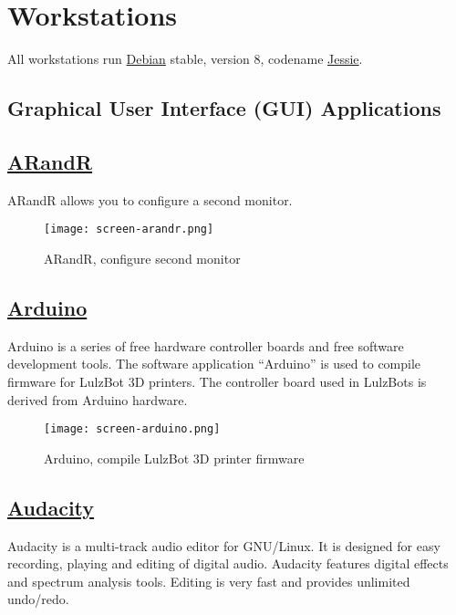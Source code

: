 \section{Workstations}
All workstations run \href{http://www.debian.org/}{Debian} stable, version 8,
codename \href{https://www.debian.org/releases/jessie/}{Jessie}.

\subsection{Graphical User Interface (GUI) Applications}

\subsection{\href{http://christian.amsuess.com/tools/arandr/}{ARandR}}
ARandR allows you to configure a second monitor.

\begin{figure}[h!]
\texttt{[image: screen-arandr.png]}
 \caption{ARandR, configure second monitor}
 \label{fig:screen-arandr}
\end{figure}

\subsection{\href{http://www.arduino.cc}{Arduino}}

Arduino is a series of free hardware controller boards and free software
development tools. The software application ``Arduino'' is used to compile
firmware for LulzBot 3D printers. The controller board used in LulzBots is
derived from Arduino hardware.

\begin{figure}[h!]
\texttt{[image: screen-arduino.png]}
 \caption{Arduino, compile LulzBot 3D printer firmware}
 \label{fig:screen-arduino}
\end{figure}

\subsection{\href{http://audacity.sourceforge.net/}{Audacity}}

 Audacity is a multi-track audio editor for GNU/Linux.
 It is designed for easy recording, playing and editing of
 digital audio.  Audacity features digital effects and spectrum
 analysis tools.  Editing is very fast and provides unlimited
 undo/redo.
 
